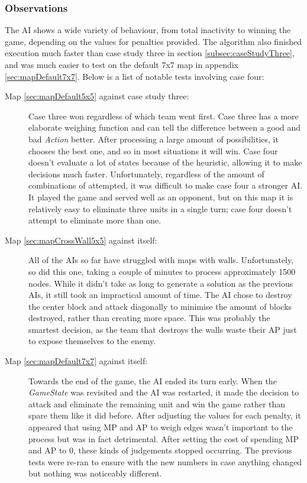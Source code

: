 \documentclass[11pt, a4paper]{report}
\begin{document}
\subsubsection{Observations}

The AI shows a wide variety of behaviour, from total inactivity to winning the game, depending on the values for penalties provided. The algorithm also finished execution much faster than case study three in section \ref{subsec:caseStudyThree}, and was much easier to test on the default 7x7 map in appendix \ref{sec:mapDefault7x7}. Below is a list of notable tests involving case four:

\begin{description}

\item[Map \ref{sec:mapDefault5x5} against case study three:] Case three won regardless of which team went first. Case three has a more elaborate weighing function and can tell the difference between a good and bad \emph{Action} better. After processing a large amount of possibilities, it chooses the best one, and so in most situations it will win. Case four doesn't evaluate a lot of states because of the heuristic, allowing it to make decisions much faster. Unfortunately, regardless of the amount of combinations of attempted, it was difficult to make case four a stronger AI. It played the game and served well as an opponent, but on this map it is relatively easy to eliminate three units in a single turn; case four doesn't attempt to eliminate more than one.

\item[Map \ref{sec:mapCrossWall5x5} against itself:] All of the AIs so far have struggled with maps with walls. Unfortunately, so did this one, taking a couple of minutes to process approximately 1500 nodes. While it didn't take as long to generate a solution as the previous AIs, it still took an impractical amount of time. The AI chose to destroy the center block and attack diagonally to minimise the amount of blocks destroyed, rather than creating more space. This was probably the smartest decision, as the team that destroys the walls waste their AP just to expose themselves to the enemy.

\item[Map \ref{sec:mapDefault7x7} against itself:] Towards the end of the game, the AI ended its turn early. When the \emph{GameState} was revisited and the AI was restarted, it made the decision to attack and eliminate the remaining unit and win the game rather than spare them like it did before. After adjusting the values for each penalty, it appeared that using MP and AP to weigh edges wasn't important to the process but was in fact detrimental. After setting the cost of spending MP and AP to 0, these kinds of judgements stopped occurring. The previous tests were re-ran to ensure with the new numbers in case anything changed but nothing was noticeably different.


\end{description}
\end{document}
